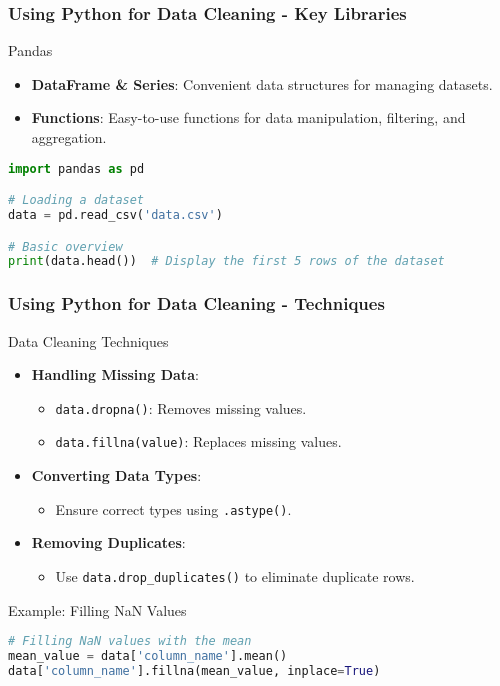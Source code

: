 \documentclass[aspectratio=169]{beamer}
\begin{document}
\begin{frame}[fragile]
    \frametitle{Using Python for Data Cleaning - Key Libraries}
    \begin{block}{Pandas}
        \begin{itemize}
            \item \textbf{DataFrame \& Series}: Convenient data structures for managing datasets.
            \item \textbf{Functions}: Easy-to-use functions for data manipulation, filtering, and aggregation.  
        \end{itemize}
        \begin{lstlisting}[language=Python]
import pandas as pd

# Loading a dataset
data = pd.read_csv('data.csv')

# Basic overview
print(data.head())  # Display the first 5 rows of the dataset
        \end{lstlisting}
    \end{block}
\end{frame}

\begin{frame}[fragile]
    \frametitle{Using Python for Data Cleaning - Techniques}
    \begin{block}{Data Cleaning Techniques}
        \begin{itemize}
            \item \textbf{Handling Missing Data}:
                \begin{itemize}
                    \item \texttt{data.dropna()}: Removes missing values.
                    \item \texttt{data.fillna(value)}: Replaces missing values.
                \end{itemize}
            \item \textbf{Converting Data Types}:
                \begin{itemize}
                    \item Ensure correct types using \texttt{.astype()}.
                \end{itemize}
            \item \textbf{Removing Duplicates}:
                \begin{itemize}
                    \item Use \texttt{data.drop\_duplicates()} to eliminate duplicate rows.
                \end{itemize}
        \end{itemize}
    \end{block}
    \begin{block}{Example: Filling NaN Values}
    \begin{lstlisting}[language=Python]
# Filling NaN values with the mean
mean_value = data['column_name'].mean()
data['column_name'].fillna(mean_value, inplace=True)
    \end{lstlisting}
    \end{block}
\end{frame}
\end{document}
